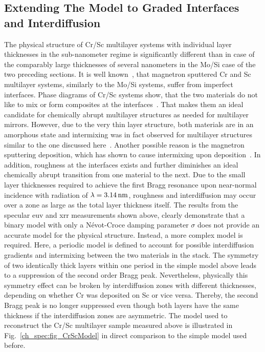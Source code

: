 \subsection{Extending The Model to Graded Interfaces and Interdiffusion} \label{ch_spec:sec_CrSc_gradual_model}
The physical structure of Cr/Sc multilayer systems with individual layer thicknesses in the sub-nanometer regime is significantly different than in case of the comparably large thicknesses of several nanometers in the Mo/Si case of the two preceding sections. It is well known~\cite{prasciolu_thermal_2014}, that magnetron sputtered Cr and Sc multilayer systems, similarly to the Mo/Si systems, suffer from imperfect interfaces. Phase diagrams of Cr/Sc systems show, that the two materials do not like to mix or form composites at the interfaces~\cite{boer_cohesion_1988}. That makes them an ideal candidate for chemically abrupt multilayer structures as needed for multilayer mirrors. However, due to the very thin layer structure, both materials are in an amorphous state and intermixing was in fact observed for multilayer structures similar to the one discussed here~\cite{ghafoor_incorporation_2008}. Another possible reason is the magnetron sputtering deposition, which has shown to cause intermixing upon deposition~\cite{eriksson_enhanced_2002}. In addition, roughness at the interfaces exists and further diminishes an ideal chemically abrupt transition from one material to the next. Due to the small layer thicknesses required to achieve the first Bragg resonance upon near-normal incidence with radiation of $\lambda=\nm{3.14}$, roughness and interdiffusion may occur over a zone as large as the total layer thickness itself. The results from the specular \gls{euv} and \gls{xrr} measurements shown above, clearly demonstrate that a binary model with only a N\'{e}vot-Croce damping parameter $\sigma$ does not provide an accurate model for the physical structure. Instead, a more complex model is required. Here, a periodic model is defined to account for possible interdiffusion gradients and intermixing between the two materials in the stack. The symmetry of two identically thick layers within one period in the simple model above leads to a suppression of the second order Bragg peak. Nevertheless, physically this symmetry effect can be broken by interdiffusion zones with different thicknesses, depending on whether Cr was deposited on Sc or vice versa. Thereby, the second Bragg peak is no longer suppressed even though both layers have the same thickness if the interdiffusion zones are asymmetric. The model used to reconstruct the Cr/Sc multilayer sample measured above is illustrated in Fig.~\ref{ch_spec:fig_CrScModel} in direct comparison to the simple model used before.
